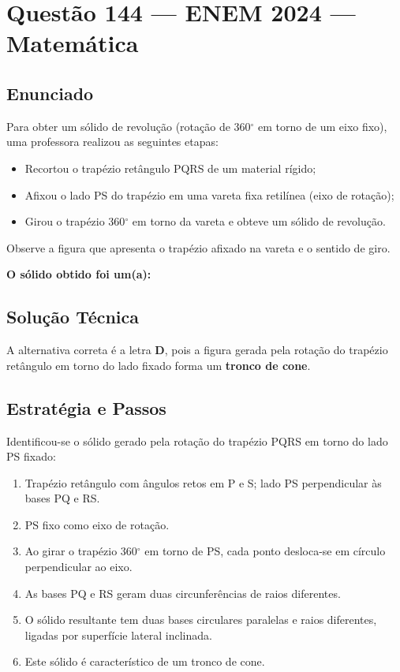 \documentclass{article}
\begin{document}
\section*{Questão 144 — ENEM 2024 — Matemática}

\subsection*{Enunciado}
Para obter um sólido de revolução (rotação de 360$^\circ$ em torno de um eixo fixo), uma professora realizou as seguintes etapas:
\begin{itemize}
  \item Recortou o trapézio retângulo PQRS de um material rígido;
  \item Afixou o lado PS do trapézio em uma vareta fixa retilínea (eixo de rotação);
  \item Girou o trapézio 360$^\circ$ em torno da vareta e obteve um sólido de revolução.
\end{itemize}
Observe a figura que apresenta o trapézio afixado na vareta e o sentido de giro.

\vspace{0.5em}
\textbf{O sólido obtido foi um(a):}

\subsection*{Solução Técnica}
A alternativa correta é a letra \textbf{D}, pois a figura gerada pela rotação do trapézio retângulo em torno do lado fixado forma um \textbf{tronco de cone}.

\subsection*{Estratégia e Passos}
Identificou-se o sólido gerado pela rotação do trapézio PQRS em torno do lado PS fixado:
\begin{enumerate}
  \item Trapézio retângulo com ângulos retos em P e S; lado PS perpendicular às bases PQ e RS.
  \item PS fixo como eixo de rotação.
  \item Ao girar o trapézio 360$^\circ$ em torno de PS, cada ponto desloca-se em círculo perpendicular ao eixo.
  \item As bases PQ e RS geram duas circunferências de raios diferentes.
  \item O sólido resultante tem duas bases circulares paralelas e raios diferentes, ligadas por superfície lateral inclinada.
  \item Este sólido é característico de um tronco de cone.
\end{enumerate}
\end{document}
